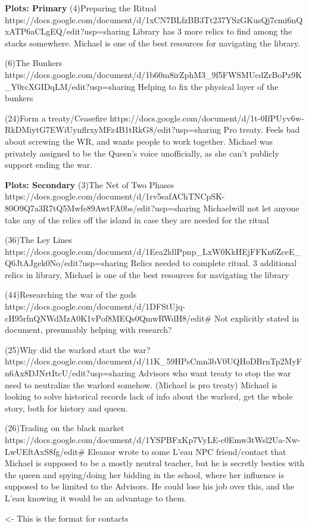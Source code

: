 \documentclass[char]{GL2020}
\begin{document}
\textbf{Plots: Primary}
(4)Preparing the Ritual
https://docs.google.com/document/d/1xCN7BLfzBB3Tt237YSzGKusQj7cmi6nQxATP6aCLgEQ/edit?usp=sharing
Library has 3 more relics to find among the stacks somewhere. Michael is one of the best resources for navigating the library.

(6)The Bunkers
https://docs.google.com/document/d/1b60m8irZphM3_9f5FWSMUcdZrBoPz9K_Y0rcXGIDqLM/edit?usp=sharing
Helping to fix the physical layer of the bunkers

(24)Form a treaty/Ceasefire
https://docs.google.com/document/d/1t-0IfPUyv6w-RkDMiytG7EWiUynflrxyMFz4B1tRkG8/edit?usp=sharing
Pro treaty. Feels bad about screwing the WR, and wants people to work together. Michael was privately assigned to be the Queen’s voice unofficially, as she can’t publicly support ending the war.

\textbf{Plots: Secondary}
(3)The Net of Two Phases
https://docs.google.com/document/d/1rv5safAChTNCpSK-80O9Q7a3R7tQ5Mwfe89AwtFA0bs/edit?usp=sharing
Michaelwill not let anyone take any of the relics off the island in case they are needed for the ritual

(36)The Ley Lines
https://docs.google.com/document/d/1Eea2ldlPpnp_LxW0KkHEjFFKn6ZceE_Q6JtAJgek0No/edit?usp=sharing
Relics needed to complete ritual.  3 additional relics in library, Michael is one of the best resources for navigating the library

(44)Researching the war of the gods
https://docs.google.com/document/d/1DFStUjq-cH95rfnQNWdMzA0K1vPof8MEQs0QmwRWdH8/edit#
Not explicitly stated in document, presumably helping with research?

(25)Why did the warlord start the war?
https://docs.google.com/document/d/11K_59HPsCmn3bV0UQHoDBrnTp2MyFn6Ax8DJNrtItcU/edit?usp=sharing
Advisors who want treaty to stop the war need to neutralize the warlord somehow.  (Michael is pro treaty) Michael is looking to solve historical records lack of info about the warlord, get the whole story, both for history and queen.

(26)Trading on the black market
https://docs.google.com/document/d/1YSPBFxKp7VyLE-c0Emw3tWsl2Ua-Nw-LwUEftAxS8fg/edit#
Eleanor wrote to some L’eau NPC friend/contact that Michael is supposed to be a mostly neutral teacher, but he is secretly besties with the queen and spying/doing her bidding in the school, where her influence is supposed to be limited to the Advisors.  He could lose his job over this, and the L’eau knowing it would be an advantage to them.


\begin{itemz}[Goals]
	\item 
\end{itemz}

\begin{itemz}[Notes]
	\item 
\end{itemz}

\begin{contacts}
	\contact{\cTest{}} <- This is the format for contacts 
\end{contacts}
\end{document}
